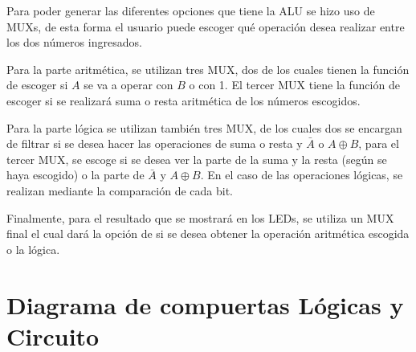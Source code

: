 \documentclass[journal, table]{IEEEtran}
\begin{document}
Para poder generar las diferentes opciones que tiene la ALU se hizo uso de MUXs, de esta forma el usuario puede escoger qué operación desea realizar entre los dos números ingresados.\cite{wakerly-1989}

Para la parte aritmética, se utilizan tres MUX, dos de los cuales tienen la función de escoger si $A$ se va a operar con $B$ o con 1. El tercer MUX tiene la función de escoger si se realizará suma o resta aritmética de los números escogidos.

Para la parte lógica se utilizan también tres MUX, de los cuales dos se encargan de filtrar si se desea hacer las operaciones de suma o resta y $\bar{A}$ o $A \oplus B$, para el tercer MUX, se escoge si se desea ver la parte de la suma y la resta (según se haya escogido) o la parte de $\bar{A}$ y $A \oplus B$. En el caso de las operaciones lógicas, se realizan mediante la comparación de cada bit.

Finalmente, para el resultado que se mostrará en los LEDs, se utiliza un MUX final el cual dará la opción de si se desea obtener la operación aritmética escogida o la lógica.

\section{Diagrama de compuertas Lógicas y Circuito}
\end{document}
